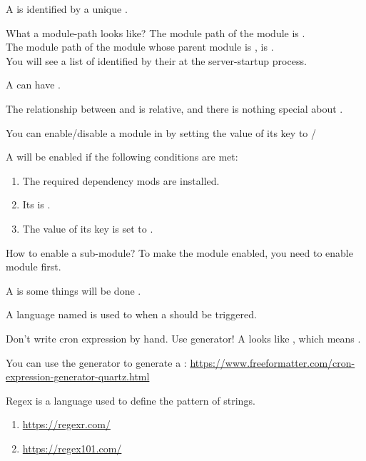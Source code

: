 A  is identified by a unique .

\begin{example}{What a module-path looks like?}
    The module path of the module  is . \\
    The module path of the module  whose parent module is , is . \\
    You will see a list of  identified by their  at the server-startup process.
\end{example}

A  can have .

The relationship between  and  is relative, and there is nothing special about .

You can enable/disable a module in  by setting the value of its  key to /
\begin{samepage}
    A  will be enabled if the following conditions are met:
    \begin{enumerate}
        \item The required dependency mods are installed.
        \item Its  is .
        \item The value of its  key is set to .
    \end{enumerate}
\end{samepage}

\begin{example}{How to enable a sub-module?}
    To make the module  enabled, you need to enable  module first.
\end{example}


\clearpage
{}\label{sec:job}

A  is some things will be done .

A language named  is used to  when a  should be triggered.

\begin{tips}{Don't write cron expression by hand. Use generator!}
    A  looks like , which means .

    You can use the generator to generate a :
    \url{https://www.freeformatter.com/cron-expression-generator-quartz.html}
\end{tips}

\clearpage
{}

Regex is a language used to define the pattern of strings.

\begin{enumerate}
    \item \url{https://regexr.com/}
    \item \url{https://regex101.com/}
\end{enumerate}




